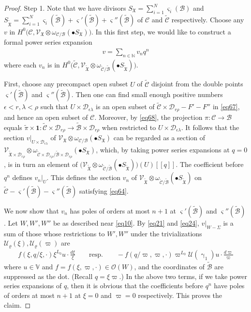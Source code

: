 \documentclass[12pt,a4paper,notitlepage]{article}
\theoremstyle{definition}
\theoremstyle{plain}
\newcommand{\fk}{\mathfrak}
\newcommand{\mc}{\mathcal}
\newcommand{\wtd}{\widetilde}
\newcommand{\id}{\mathbf{1}}
\newcommand{\scr}{\mathscr}
\newcommand{\sgm}{\varsigma}
\newcommand{\blt}{\bullet}
\newcommand{\Vbb}{\mathbb V}
\newcommand{\Nbb}{\mathbb N}
\numberwithin{equation}{section}
\begin{document}
\begin{proof}
	Step 1. Note that we have divisors $S_{\fk X}=\sum_{i=1}^N\sgm_i(\mc B)$ and $S_{\wtd{\fk X}}=\sum_{i=1}^N\sgm_i(\wtd{\mc B})+\sgm'(\wtd{\mc B})+\sgm''(\wtd{\mc B})$ of $\mc C$ and $\wtd{\mc C}$ respectively. Choose any $v$ in $H^0\big(\mc C,\scr V_{\fk X}\otimes\omega_{\mc C/\mc B}(\blt S_{\fk X})\big)$.  In this first step, we would like to construct a formal power series expansion
	\begin{align}
	v=\sum_{n\in\Nbb}v_{n}q^n\label{eq64}
	\end{align}
	where each $v_{n}$ is in $H^0\big(\wtd{\mc C},\scr V_{\wtd{\fk X}}\otimes\omega_{\wtd{\mc C}/\wtd{\mc B}}(\blt S_{\wtd{\fk X}})\big)$.  
	
	First, choose any precompact open subset $U$ of $\wtd{\mc C}$ disjoint from the double points $\sgm'(\wtd{\mc B})$ and $\sgm''(\wtd{\mc B})$. Then  one can find small enough positive numbers $\epsilon<r,\lambda<\rho$  such that $U\times\mc D_{\epsilon\lambda}$ is an open subset of  $\wtd {\mc C}\times\mc D_{r\rho}- F'-F''$ in \eqref{eq67}, and hence an open subset of $\mc C$.   Moreover, by \eqref{eq68}, the projection $\pi:\mc C\rightarrow\mc B$ equals $\wtd \pi\times \id:\wtd {\mc C}\times\mc D_{r\rho}\rightarrow \wtd{\mc B}\times \mc D_{r\rho}$ when restricted to  $U\times \mc D_{\epsilon\lambda}$. It follows that the section $v|_{U\times \mc D_{\epsilon\lambda}}$  of $\scr V_{\fk X}\otimes\omega_{\mc C/\mc B}(\blt S_{\fk X})$ can be regarded as a section of $\scr V_{\wtd{\fk X}\times\mc D_{r\rho}}\otimes\omega_{\wtd{\mc C}\times\mc D_{r\rho}/\wtd{\mc B}\times\mc D_{r\rho}}(\blt S_{\fk X})$, which, by taking power series expansions at $q=0$, is in turn an element of $\big(\scr V_{\wtd{\fk X}}\otimes\omega_{\wtd{\mc C}/\wtd{\mc B}}(\blt S_{\wtd{\fk X}})\big)(U)[[q]]$. The coefficient before $q^{n}$ defines $v_{n}|_{U}$. This defines the section $v_{n}$ of $\scr V_{\wtd{\fk X}}\otimes\omega_{\wtd{\mc C}/\wtd{\mc B}}(\blt S_{\wtd{\fk X}})$ on $\wtd{\mc C}-\sgm'(\wtd{\mc B})- \sgm''(\wtd{\mc B})$ satisfying \eqref{eq64}.
	
	We now show that $v_{n}$ has poles of orders at most $n+1$ at $\sgm'(\wtd{\mc B})$ and $\sgm''(\wtd{\mc B})$. Let $W,W',W''$ be as described near \eqref{eq10}. By \eqref{eq21} and \eqref{eq24}, $v|_{W-\Sigma}$ is a sum of those whose restrictions to $W',W''$  under the trivializations $\mc U_\varrho(\xi),\mc U_\varrho(\varpi)$ are
	\begin{align}
	f(\xi,q/\xi,\cdot)\xi^{L_0}u\cdot \frac{d\xi}{\xi}  \qquad\text{resp.}\qquad -f(q/\varpi,\varpi,\cdot)\varpi^{L_0}\mc U(\upgamma_1)u\cdot \frac{d\varpi}{\varpi}\label{eq65}
	\end{align}
	where $u\in\Vbb$ and $f=f(\xi,\varpi,\cdot)\in\scr O(W)$, and the coordinates of $\wtd {\mc B}$ are suppressed as the dot. (Recall $q=\xi\varpi$.) In the above two terms, if we take power series expansions of $q$, then it is obvious that the coefficients before  $q^{n}$ have poles of orders at most $n+1$ at $\xi=0$ and $\varpi=0$ respectively. This proves the claim.
	

\end{proof}
\end{document}
